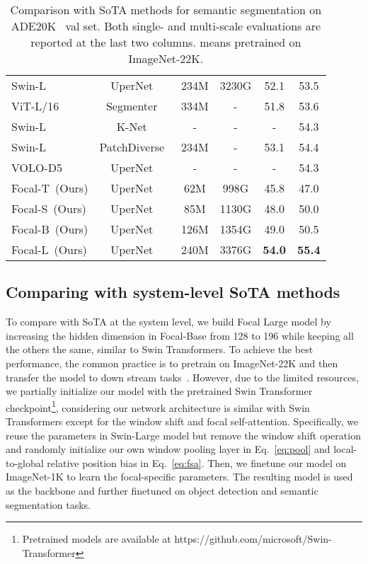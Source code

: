 \documentclass{article}
\newcommand{\adevalss}{\textbf{54.0}}
\newcommand{\adevalms}{\textbf{55.4}}
\begin{document}
\begin{table}
\begin{minipage}{0.47\linewidth}
{\begin{tabular}{lccc|cc}
    Swin-L~\cite{liu2021swin} & UperNet~\cite{xiao2018unified} & 234M & 3230G & 52.1 & 53.5 \\
    ViT-L/16~\cite{dosovitskiy2020image} & Segmenter~\cite{strudel2021segmenter} & 334M & - & 51.8 & 53.6 \\
    Swin-L~\cite{liu2021swin} & K-Net~\cite{zhang2021knet} & - & - & - & 54.3 \\
    Swin-L~\cite{liu2021swin} & PatchDiverse~\cite{gong2021vision} & 234M & - & 53.1 & 54.4 \\
    VOLO-D5~\cite{yuan2021volo} & UperNet~\cite{xiao2018unified} & - & - & - & 54.3 \\
    \midrule
     \rowcolor{Gray} 
    Focal-T~(Ours) & UperNet~\cite{xiao2018unified} & 62M & 998G & 45.8 & 47.0 \\
     \rowcolor{Gray} 
    Focal-S~(Ours) & UperNet~\cite{xiao2018unified} & 85M & 1130G & 48.0 & 50.0\\     
     \rowcolor{Gray} 
    Focal-B~(Ours) & UperNet~\cite{xiao2018unified} & 126M & 1354G & 49.0 & 50.5 \\      
     \rowcolor{Gray} 
    Focal-L~(Ours) & UperNet~\cite{xiao2018unified} & 240M & 3376G & \adevalss & \adevalms  \\   
    \bottomrule
\end{tabular} 
  }
  \vspace{2pt}
  \caption{Comparison with SoTA methods for semantic segmentation on ADE20K~\cite{zhou2017scene} val set. Both single- and multi-scale evaluations are reported at the last two columns.  means pretrained on ImageNet-22K.}
  \label{tab:semantic_segmentation}
  \end{minipage}  
\end{table}

\subsection{Comparing with system-level SoTA methods}
To compare with SoTA at the system level, we build Focal Large model by increasing the hidden dimension in Focal-Base from 128 to 196 while keeping all the others the same, similar to Swin Transformers. 
To achieve the best performance, the common practice is to pretrain on ImageNet-22K and then transfer the model to down stream tasks~\cite{wu2021cvt,liu2021swin}. However, due to the limited resources, we partially initialize our model with the pretrained Swin Transformer checkpoint\footnote{Pretrained models are available at https://github.com/microsoft/Swin-Transformer}, considering our network architecture is similar with Swin Transformers except for the window shift and focal self-attention. 
Specifically, we reuse the parameters in Swin-Large model but remove the window shift operation and randomly initialize our own window pooling layer in Eq.~\eqref{eq:pool} and local-to-global relative position bias in Eq.~\eqref{eq:fsa}. Then, we finetune our model on ImageNet-1K to learn the focal-specific parameters. The resulting model is used as the backbone and further finetuned on object detection and semantic segmentation tasks.
\end{document}
